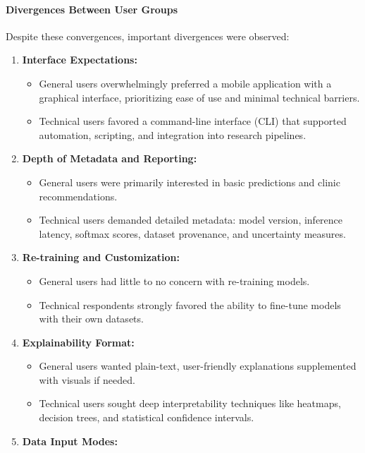 \documentclass[
  12pt,
  oneside]{article}
\providecommand{\tightlist}{%
  \setlength{\itemsep}{0pt}\setlength{\parskip}{0pt}}
\begin{document}
\paragraph{Divergences Between User
Groups}\label{divergences-between-user-groups}

Despite these convergences, important divergences were observed:

\begin{enumerate}
\def\labelenumi{\arabic{enumi}.}
\item
  \textbf{Interface Expectations:}

  \begin{itemize}
  \tightlist
  \item
    General users overwhelmingly preferred a mobile application with a
    graphical interface, prioritizing ease of use and minimal technical
    barriers.\\
  \item
    Technical users favored a command-line interface (CLI) that
    supported automation, scripting, and integration into research
    pipelines.
  \end{itemize}
\item
  \textbf{Depth of Metadata and Reporting:}

  \begin{itemize}
  \tightlist
  \item
    General users were primarily interested in basic predictions and
    clinic recommendations.\\
  \item
    Technical users demanded detailed metadata: model version, inference
    latency, softmax scores, dataset provenance, and uncertainty
    measures.
  \end{itemize}
\item
  \textbf{Re-training and Customization:}

  \begin{itemize}
  \tightlist
  \item
    General users had little to no concern with re-training models.\\
  \item
    Technical respondents strongly favored the ability to fine-tune
    models with their own datasets.
  \end{itemize}
\item
  \textbf{Explainability Format:}

  \begin{itemize}
  \tightlist
  \item
    General users wanted plain-text, user-friendly explanations
    supplemented with visuals if needed.\\
  \item
    Technical users sought deep interpretability techniques like
    heatmaps, decision trees, and statistical confidence intervals.
  \end{itemize}
\item
  \textbf{Data Input Modes:}


\end{enumerate}
\end{document}
